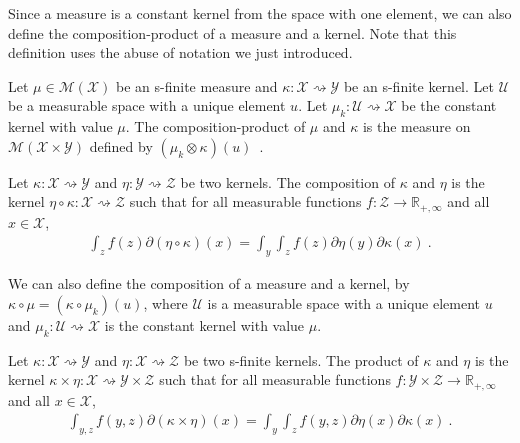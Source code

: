 Since a measure is a constant kernel from the space with one element, we can also define the composition-product of a measure and a kernel. Note that this definition uses the abuse of notation we just introduced.

\begin{definition}
  \label{def:measure_compProd}
  \leanok
  Let $\mu \in \mathcal M(\mathcal X)$ be an s-finite measure and $\kappa : \mathcal X \rightsquigarrow \mathcal Y$ be an s-finite kernel.
  Let $\mathcal U$ be a measurable space with a unique element $u$. Let $\mu_k : \mathcal U \rightsquigarrow \mathcal X$ be the constant kernel with value $\mu$.
  The composition-product of $\mu$ and $\kappa$ is the measure on $\mathcal M(\mathcal X \times \mathcal Y)$ defined by $(\mu_k \otimes \kappa) (u)$~.
\end{definition}

\begin{definition}[Composition]
  \label{def:kernel_comp}
  \leanok
  Let $\kappa : \mathcal X \rightsquigarrow \mathcal Y$ and $\eta : \mathcal Y \rightsquigarrow \mathcal Z$ be two kernels.
  The composition of $\kappa$ and $\eta$ is the kernel $\eta \circ \kappa : \mathcal X \rightsquigarrow \mathcal Z$ such that for all measurable functions $f : \mathcal Z \to \mathbb{R}_{+,\infty}$ and all $x \in \mathcal X$,
  \begin{align*}
  \int_z f(z) \partial(\eta \circ \kappa)(x) = \int_y \int_z f(z) \partial\eta(y) \partial\kappa(x) \: .
  \end{align*}
\end{definition}

We can also define the composition of a measure and a kernel, by $\kappa \circ \mu = (\kappa \circ \mu_k) (u)$, where $\mathcal U$ is a measurable space with a unique element $u$ and $\mu_k : \mathcal U \rightsquigarrow \mathcal X$ is the constant kernel with value $\mu$.

\begin{definition}[Product]
  \label{def:kernel_prod}
  \leanok
  Let $\kappa : \mathcal X \rightsquigarrow \mathcal Y$ and $\eta : \mathcal X \rightsquigarrow \mathcal Z$ be two s-finite kernels.
  The product of $\kappa$ and $\eta$ is the kernel $\kappa \times \eta : \mathcal X \rightsquigarrow \mathcal Y \times \mathcal Z$ such that for all measurable functions $f : \mathcal Y \times \mathcal Z \to \mathbb{R}_{+,\infty}$ and all $x \in \mathcal X$,
  \begin{align*}
  \int_{y,z} f(y,z) \partial(\kappa \times \eta)(x) = \int_y \int_z f(y,z) \partial\eta(x) \partial\kappa(x) \: .
  \end{align*}
\end{definition}

